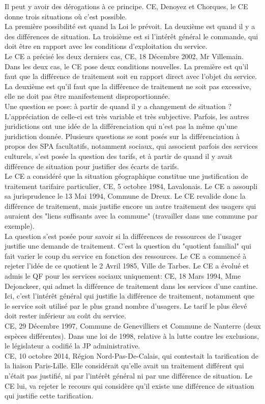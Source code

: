\documentclass[10pt, a4paper, openany]{book}
\begin{document}
Il peut y avoir des dérogations à ce principe. CE, Denoyez et Chorques, le CE donne trois situations où c'est possible. \\
La première possibilité est quand la Loi le prévoit. La deuxième est quand il y a des différences de situation. La troisième est si l'intérêt général le commande, qui doit être en rapport avec les conditions d'exploitation du service. \\
Le CE a précisé les deux derniers cas, CE, 18 Décembre 2002, Mr Villemain. Dans les deux cas, le CE pose deux conditions nouvelles. La première est qu'il faut que la différence de traitement soit en rapport direct avec l'objet du service. La deuxième est qu'il faut que la différence de traitement ne soit pas excessive, elle ne doit pas être manifestement disproportionnée. \\
Une question se pose: à partir de quand il y a changement de situation ? L'appréciation de celle-ci est très variable et très subjective. Parfois, les autres juridictions ont une idée de la différenciation qui n'est pas la même qu'une juridiction donnée. Plusieurs questions se sont posés sur la différenciation à propos des SPA facultatifs, notamment sociaux, qui associent parfois des services culturels, s'est posée la question des tarifs, et à partir de quand il y avait différence de situation pour justifier des écarts de tarifs. \\
Le CE a considéré que la situation géographique constitue une justification de traitement tarifaire particulier, CE, 5 octobre 1984, Lavalonais. Le CE a assoupli sa jurisprudence le 13 Mai 1994, Commune de Dreux. Le CE revalide donc la différence de traitement, mais justifie encore un autre traitement des usagers qui auraient des "liens suffisants avec la commune" (travailler dans une commune par exemple). \\
La question s'est posée pour savoir si la différences de ressources de l'usager justifie une demande de traitement. C'est la question du "quotient familial" qui fait varier le coup du service en fonction des ressources. Le CE a commencé à rejeter l'idée de ce quotient le 2 Avril 1985, Ville de Tarbes. Le CE a évolué et admis le QF pour les services sociaux uniquement: CE, 18 Mars 1994, Mme Dejonckeer, qui admet la différence de traitement dans les services d'une cantine. Ici, c'est l'intérêt général qui justifie la différence de traitement, notamment que le service soit utilisé par le plus grand nombre d'usagers. Le tarif le plus élevé doit rester inférieur au coût du service. \\
CE, 29 Décembre 1997, Commune de Genevilliers et Commune de Nanterre (deux espèces différentes). Dans une loi de 1998, relative à la lutte contre les exclusions, le législateur a codifié la JP administrative. \\
CE, 10 octobre 2014, Région Nord-Pas-De-Calais, qui contestait la tarification de la liaison Paris-Lille. Elle considérait qu'elle avait un traitement différent qui n'était pas justifié, ni par l'intérêt général ni par une différence de situation. Le CE lui, va rejeter le recours qui considère qu'il existe une différence de situation qui justifie cette tarification. 
\end{document}
